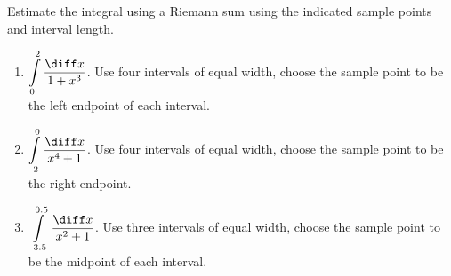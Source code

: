 Estimate the integral using a Riemann sum using the indicated sample points and interval length.
\begin{enumerate}
\item $\displaystyle \int\limits_0^2 \frac{\diff x}{1+x^3}$. Use four intervals of equal width, choose the sample point to be the left endpoint of each interval. 


\item $\displaystyle \int\limits_{-2}^{0} \frac{\diff x}{x^4+1} $. Use four intervals of equal width, choose the sample point to be the right endpoint. 


\item\label{problemRiemannSum-1div1plusxsquared} $\displaystyle \int\limits_{-3.5}^{0.5} \frac{\diff x}{x^2+1} $. Use three intervals of equal width, choose the sample point to be the midpoint of each interval. 


\end{enumerate}


